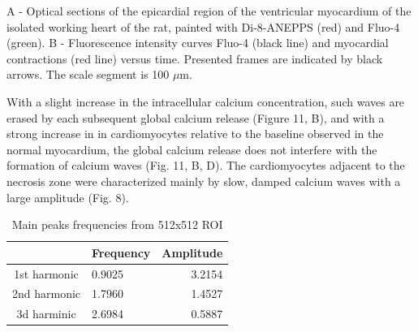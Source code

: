 \documentclass{biophys-new}
\begin{document}
A - Optical sections of the epicardial region of the ventricular myocardium of the isolated working heart of the rat, painted with Di-8-ANEPPS (red) and Fluo-4 (green). B - Fluorescence intensity curves Fluo-4 (black line) and myocardial contractions (red line) versus time. Presented frames are indicated by black arrows.
The scale segment is 100 $\mu$m.




 With a slight increase in the intracellular calcium concentration, such waves are erased by each subsequent global calcium release (Figure 11, B), and with a strong increase in  in cardiomyocytes relative to the baseline observed in the normal myocardium, the global calcium release does not interfere with the formation of calcium waves (Fig. 11, B, D).
 The cardiomyocytes adjacent to the necrosis zone were characterized mainly by slow, damped calcium waves with a large amplitude (Fig. 8).

 \begin{table}[hb!]
 \caption{Main peaks frequencies from 512x512 ROI}
 \label{tab:freq}
 \centering
 \begin{threeparttable}
 \begin{tabular}{c l r}
 \hline
  & Frequency & Amplitude  \\\hline
 1st harmonic & 0.9025 & 3.2154 \\
 2nd harmonic & 1.7960 & 1.4527  \\
 3d harminic & 2.6984 & 0.5887    \\
 \hline
 \end{tabular}
 \end{threeparttable}
 \end{table}
\end{document}
